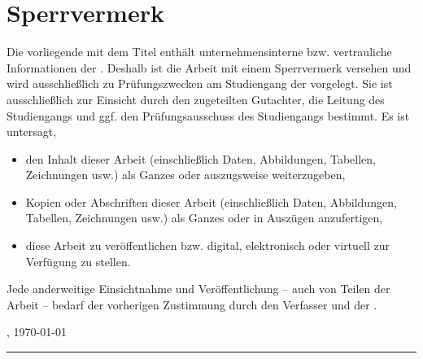 \section*{Sperrvermerk}

Die vorliegende \art\/ mit dem Titel {\itshape{}\titel\/} enthält unternehmensinterne bzw. vertrauliche Informationen der \firma. Deshalb ist die Arbeit mit einem Sperrvermerk versehen und wird ausschließlich zu Prüfungszwecken am Studiengang \studienfach\/ der \hochschule\/ \campus\/ vorgelegt. Sie ist ausschließlich zur Einsicht durch den zugeteilten Gutachter, die Leitung des Studiengangs und ggf. den Prüfungsausschuss des Studiengangs bestimmt.  Es ist untersagt,
  \begin{itemize}
  \item den Inhalt dieser Arbeit (einschließlich Daten, Abbildungen, Tabellen, Zeichnungen usw.) als Ganzes oder auszugsweise weiterzugeben,
  \item Kopien oder Abschriften dieser Arbeit (einschließlich Daten, Abbildungen, Tabellen, Zeichnungen usw.) als Ganzes oder in Auszügen anzufertigen,
  \item diese Arbeit zu veröffentlichen bzw. digital, elektronisch oder virtuell zur Verfügung zu stellen. 
  \end{itemize}
Jede anderweitige Einsichtnahme und Veröffentlichung – auch von Teilen der Arbeit – bedarf der vorherigen Zustimmung durch den Verfasser und der \firma.


\vspace{3em}

\abgabeort, \today
\vspace{4em}

\rule{6cm}{0.4pt}\\
\autor